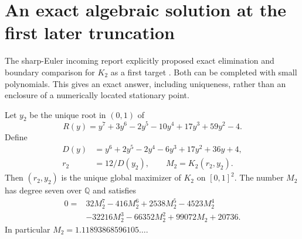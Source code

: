 \section{An exact algebraic solution at the first later truncation}
\label{sec:exact-M2}

The sharp-Euler incoming report explicitly proposed exact elimination
and boundary comparison for $K_2$ as a first target
\cite[Section 8]{SharpEulerIncoming}. Both can be completed with small
polynomials. This gives an exact answer, including uniqueness, rather
than an enclosure of a numerically located stationary point.

\begin{theorem}\label{thm:M2}
Let $y_2$ be the unique root in $(0,1)$ of
\begin{equation}\label{eq:M2-R}
 R(y)=y^7+3y^6-2y^5-10y^4+17y^3+59y^2-4.
\end{equation}
Define
\begin{align}
 D(y)&=y^6+2y^5-2y^4-6y^3+17y^2+36y+4,
 \label{eq:M2-D}\\
 r_2&=12/D(y_2),\qquad M_2=K_2(r_2,y_2).
 \label{eq:M2-r}
\end{align}
Then $(r_2,y_2)$ is the unique global maximizer of $K_2$ on
$[0,1]^2$. The number $M_2$ has degree seven over $\mathbb Q$ and
satisfies
\begin{equation}\label{eq:M2-minpoly}
\begin{split}
 0={}&32M_2^7-416M_2^6+2538M_2^5-4523M_2^4\\
    &-32216M_2^3-66352M_2^2+99072M_2+20736.
\end{split}
\end{equation}
In particular $M_2=1.11893868596105\ldots$.
\end{theorem}
